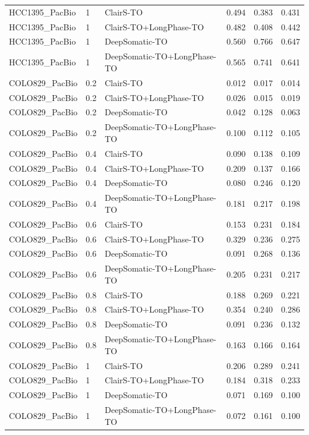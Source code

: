 \documentclass[pdflatex,sn-nature]{sn-jnl}
\begin{document}
{\begin{longtable}{@{}lllccc@{}}
  HCC1395\_PacBio & 1 & ClairS-TO & 0.494 & 0.383 & 0.431 \\
  HCC1395\_PacBio & 1 & ClairS-TO+LongPhase-TO & 0.482 & 0.408 & 0.442 \\
  HCC1395\_PacBio & 1 & DeepSomatic-TO & 0.560 & 0.766 & 0.647 \\
  HCC1395\_PacBio & 1 & DeepSomatic-TO+LongPhase-TO & 0.565 & 0.741 & 0.641 \\
  \addlinespace
  COLO829\_PacBio & 0.2 & ClairS-TO & 0.012 & 0.017 & 0.014 \\
  COLO829\_PacBio & 0.2 & ClairS-TO+LongPhase-TO & 0.026 & 0.015 & 0.019 \\
  COLO829\_PacBio & 0.2 & DeepSomatic-TO & 0.042 & 0.128 & 0.063 \\
  COLO829\_PacBio & 0.2 & DeepSomatic-TO+LongPhase-TO & 0.100 & 0.112 & 0.105 \\
  COLO829\_PacBio & 0.4 & ClairS-TO & 0.090 & 0.138 & 0.109 \\
  COLO829\_PacBio & 0.4 & ClairS-TO+LongPhase-TO & 0.209 & 0.137 & 0.166 \\
  COLO829\_PacBio & 0.4 & DeepSomatic-TO & 0.080 & 0.246 & 0.120 \\
  COLO829\_PacBio & 0.4 & DeepSomatic-TO+LongPhase-TO & 0.181 & 0.217 & 0.198 \\
  COLO829\_PacBio & 0.6 & ClairS-TO & 0.153 & 0.231 & 0.184 \\
  COLO829\_PacBio & 0.6 & ClairS-TO+LongPhase-TO & 0.329 & 0.236 & 0.275 \\
  COLO829\_PacBio & 0.6 & DeepSomatic-TO & 0.091 & 0.268 & 0.136 \\
  COLO829\_PacBio & 0.6 & DeepSomatic-TO+LongPhase-TO & 0.205 & 0.231 & 0.217 \\
  COLO829\_PacBio & 0.8 & ClairS-TO & 0.188 & 0.269 & 0.221 \\
  COLO829\_PacBio & 0.8 & ClairS-TO+LongPhase-TO & 0.354 & 0.240 & 0.286 \\
  COLO829\_PacBio & 0.8 & DeepSomatic-TO & 0.091 & 0.236 & 0.132 \\
  COLO829\_PacBio & 0.8 & DeepSomatic-TO+LongPhase-TO & 0.163 & 0.166 & 0.164 \\
  COLO829\_PacBio & 1 & ClairS-TO & 0.206 & 0.289 & 0.241 \\
  COLO829\_PacBio & 1 & ClairS-TO+LongPhase-TO & 0.184 & 0.318 & 0.233 \\
  COLO829\_PacBio & 1 & DeepSomatic-TO & 0.071 & 0.169 & 0.100 \\
  COLO829\_PacBio & 1 & DeepSomatic-TO+LongPhase-TO & 0.072 & 0.161 & 0.100 \\

\end{longtable}}
\end{document}
